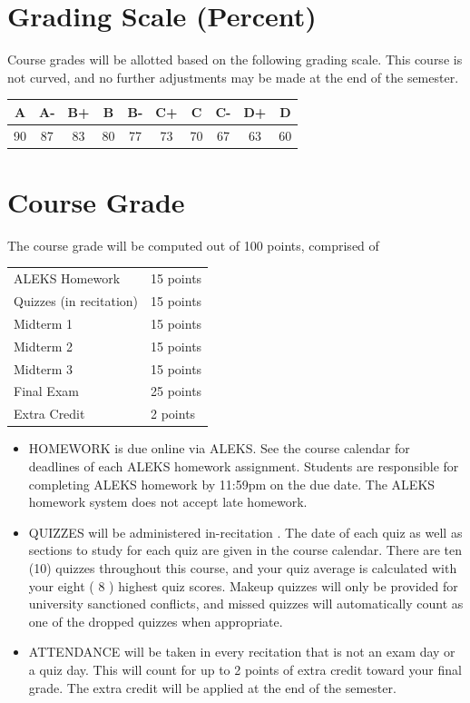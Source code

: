 \documentclass{ximera}
\begin{document}
\section*{Grading Scale (Percent)}
Course grades will be allotted based on the following grading scale. This course is not curved, and no further adjustments may be made at the end of the semester.

\begin{center}
\begin{tabular}{c|c|c|c|c|c|c|c|c|c}
A & A- & B+ & B & B- & C+ & C & C- & D+ & D \\
\hline
90 & 87 & 83 & 80 & 77 & 73 & 70 & 67 & 63 & 60 \\
\hline
\end{tabular}
\end{center}

\section*{Course Grade}
The course grade will be computed out of 100 points, comprised of

\begin{center}
\begin{tabular}{l|l}
ALEKS Homework & 15 points \\
Quizzes (in recitation) & 15 points \\
Midterm 1 & 15 points \\
Midterm 2 & 15 points \\
Midterm 3 & 15 points \\
Final Exam & 25 points \\
Extra Credit & 2 points \\
\end{tabular}
\end{center}

\begin{itemize}
  \item HOMEWORK is due online via ALEKS. See the course calendar for deadlines of each ALEKS homework assignment. Students are responsible for completing ALEKS homework by 11:59pm on the due date. The ALEKS homework system does not accept late homework.
  \item QUIZZES will be administered in-recitation . The date of each quiz as well as sections to study for each quiz are given in the course calendar. There are ten (10) quizzes throughout this course, and your quiz average is calculated with your eight ( 8 ) highest quiz scores. Makeup quizzes will only be provided for university sanctioned conflicts, and missed quizzes will automatically count as one of the dropped quizzes when appropriate.
  \item ATTENDANCE will be taken in every recitation that is not an exam day or a quiz day. This will count for up to 2 points of extra credit toward your final grade. The extra credit will be applied at the end of the semester.
\end{itemize}
\end{document}
